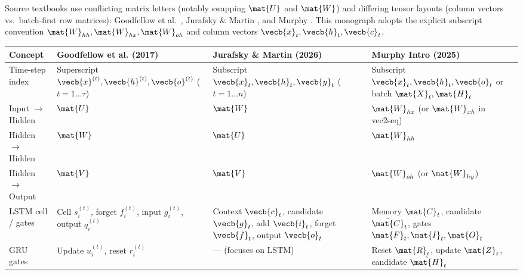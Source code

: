 \documentclass[../../../../master.tex]{subfiles}
\begin{document}
\begin{crossbook}
\label{tab:rnn:notation}
Source textbooks use conflicting matrix letters (notably swapping $\mat{U}$ and $\mat{W}$) and differing tensor layouts (column vectors vs.\ batch-first row matrices): Goodfellow et al.\ , Jurafsky \& Martin , and Murphy . This monograph adopts the explicit subscript convention $\mat{W}_{hh}, \mat{W}_{hx}, \mat{W}_{oh}$ and column vectors $\vecb{x}_t, \vecb{h}_t, \vecb{c}_t$.
\vspace{4pt}
\begin{tabularx}{\textwidth}{@{}p{2.3cm}>{\raggedright\arraybackslash}X>{\raggedright\arraybackslash}X>{\raggedright\arraybackslash}X@{}}
\toprule
\textbf{Concept} & \textbf{Goodfellow et al. (2017)} & \textbf{Jurafsky \& Martin (2026)} & \textbf{Murphy Intro (2025)} \\
\midrule
Time-step index & Superscript $\vecb{x}^{(t)}, \vecb{h}^{(t)}, \vecb{o}^{(t)}$ ($t=1\dots\tau$) & Subscript $\vecb{x}_t, \vecb{h}_t, \vecb{y}_t$ ($t=1\dots n$) & Subscript $\vecb{x}_t, \vecb{h}_t, \vecb{o}_t$ or batch $\mat{X}_t, \mat{H}_t$ \\
Input $\to$ Hidden & $\mat{U}$ & $\mat{W}$ & $\mat{W}_{hx}$ (or $\mat{W}_{xh}$ in vec2seq) \\
Hidden $\to$ Hidden & $\mat{W}$ & $\mat{U}$ & $\mat{W}_{hh}$ \\
Hidden $\to$ Output & $\mat{V}$ & $\mat{V}$ & $\mat{W}_{oh}$ (or $\mat{W}_{hy}$) \\
LSTM cell / gates & Cell $s_i^{(t)}$, forget $f_i^{(t)}$, input $g_i^{(t)}$, output $q_i^{(t)}$ & Context $\vecb{c}_t$, candidate $\vecb{g}_t$, add $\vecb{i}_t$, forget $\vecb{f}_t$, output $\vecb{o}_t$ & Memory $\mat{C}_t$, candidate $\tilde{\mat{C}}_t$, gates $\mat{F}_t, \mat{I}_t, \mat{O}_t$ \\
GRU gates & Update $u_i^{(t)}$, reset $r_i^{(t)}$ & --- (focuses on LSTM) & Reset $\mat{R}_t$, update $\mat{Z}_t$, candidate $\tilde{\mat{H}}_t$ \\
\bottomrule
\end{tabularx}
\end{crossbook}

\end{document}
